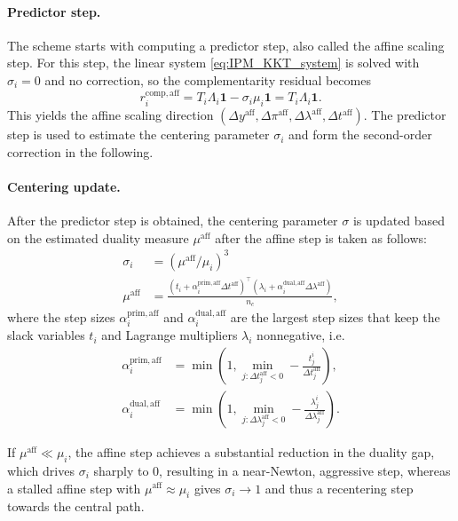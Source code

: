 \documentclass[class=scrbook, crop=false]{standalone}
\begin{document}
\paragraph{Predictor step.}
The scheme starts with computing a predictor step, also called the affine scaling step.
For this step, the linear system \eqref{eq:IPM_KKT_system} is solved with $\sigma_i=0$ and no correction, 
so the complementarity residual becomes
\begin{equation}
    \label{eq:predictor_complementarity}
    r_i^{\mathrm{comp}, \mathrm{aff}}
    = T_i\Lambda_i\mathbf{1} - \sigma_i\mu_i\mathbf{1}
    = T_i\Lambda_i\mathbf{1}.
\end{equation}
This yields the affine scaling direction $(\Delta y^{\mathrm{aff}},\Delta \pi^{\mathrm{aff}},\Delta\lambda^{\mathrm{aff}},\Delta t^{\mathrm{aff}})$.
The predictor step is used to estimate the centering parameter $\sigma_i$ and form the second-order correction in the following.

\paragraph{Centering update.}
After the predictor step is obtained, the centering parameter $\sigma$ is updated 
based on the estimated duality measure $\mu^{\mathrm{aff}}$ after the affine step is taken as follows:
\begin{align}
    \sigma_i &= (\mu^{\mathrm{aff}}/\mu_i)^3 \label{eq:centering} \\
    \mu^{\mathrm{aff}} &= \frac{(t_i + \alpha_i^{\mathrm{prim}, \mathrm{aff}} \Delta t^{\mathrm{aff}})^\top (\lambda_i + \alpha_i^{\mathrm{dual}, \mathrm{aff}} \Delta \lambda^{\mathrm{aff}})}{n_c},
\end{align}
where the step sizes
$\alpha_i^{\mathrm{prim}, \mathrm{aff}}$ and $\alpha_i^{\mathrm{dual}, \mathrm{aff}}$ are 
the largest step sizes that keep the slack variables $t_i$ and Lagrange multipliers $\lambda_i$ nonnegative,
i.e.
\begin{align}
    \label{eq:max_step_size}
    \alpha_i^{\mathrm{prim}, \mathrm{aff}} &= \min\left(1, \min_{j:\Delta t_j^{\mathrm{aff}}<0} -\frac{t_j^i}{\Delta t_j^{\mathrm{aff}}}\right), \\
    \alpha_i^{\mathrm{dual}, \mathrm{aff}} &= \min\left(1, \min_{j:\Delta \lambda_j^{\mathrm{aff}}<0} -\frac{\lambda_j^i}{\Delta \lambda_j^{\mathrm{aff}}}\right).
\end{align}

If $\mu^{\mathrm{aff}} \ll \mu_i$, 
the affine step achieves a substantial reduction in the duality gap,
which drives $\sigma_i$ sharply to $0$, resulting in a near-Newton, aggressive step,
whereas a stalled affine step with $\mu^{\mathrm{aff}} \approx \mu_i$
gives $\sigma_i \to 1$ and thus a recentering step towards the central path.
\end{document}
